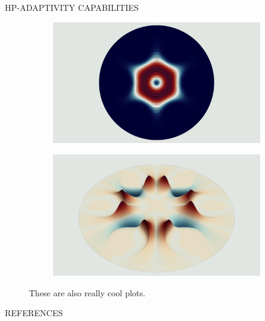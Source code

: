 \documentclass[debug]{beamer} %
\begin{document}
\begin{frame}
\begin{columns}
\begin{column}{0.45\textwidth}
{\begin{block}{\boxnumber HP-ADAPTIVITY CAPABILITIES }
\begin{figure}[hb]
\begin{mdframed}[backgroundcolor=bggrey]
					\begin{subfigure}[b]{.4999\textwidth}
						\centering
						\includegraphics[width=1\linewidth]{images/et2posterHoley.png}%
					\end{subfigure}\hfill
					\begin{subfigure}[b]{.4999\textwidth}
						\centering
						\includegraphics[width=1\linewidth]{images/ez2posterHoley.png}%
					\end{subfigure}
				\end{mdframed}
				\caption{These are also really cool plots.}
				\label{fig:plot-holey}
			\end{figure}
        \end{block}

        \vfill
        \begin{block}{REFERENCES}
        	\printbibliography
        \end{block}

        \vfill
      } %
    \end{column}

  \end{columns}
\end{frame}
\end{document}
